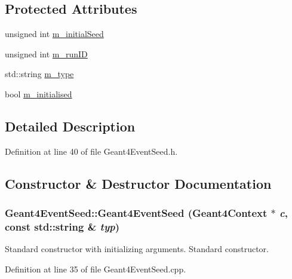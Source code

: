 \subsection*{Protected Attributes}
\begin{DoxyCompactItemize}
\item 
unsigned int \hyperlink{class_d_d4hep_1_1_simulation_1_1_geant4_event_seed_aad2e0264889e33271d97832966d516b0}{m\_\-initialSeed}
\item 
unsigned int \hyperlink{class_d_d4hep_1_1_simulation_1_1_geant4_event_seed_a0810bca4809cd7a1293ed324cb427daa}{m\_\-runID}
\item 
std::string \hyperlink{class_d_d4hep_1_1_simulation_1_1_geant4_event_seed_ae04ac0bb4801305fa677c4f4bce1a1ea}{m\_\-type}
\item 
bool \hyperlink{class_d_d4hep_1_1_simulation_1_1_geant4_event_seed_a8fa0790e30cdbac4a172af5ff0fd7cc7}{m\_\-initialised}
\end{DoxyCompactItemize}


\subsection{Detailed Description}


Definition at line 40 of file Geant4EventSeed.h.

\subsection{Constructor \& Destructor Documentation}
\hypertarget{class_d_d4hep_1_1_simulation_1_1_geant4_event_seed_af30e767cc26c46b017fa8ce36fc8c906}{
\subsubsection[{Geant4EventSeed}]{\setlength{\rightskip}{0pt plus 5cm}Geant4EventSeed::Geant4EventSeed ({\bf Geant4Context} $\ast$ {\em c}, \/  const std::string \& {\em typ})}}
\label{class_d_d4hep_1_1_simulation_1_1_geant4_event_seed_af30e767cc26c46b017fa8ce36fc8c906}


Standard constructor with initializing arguments. Standard constructor. 

Definition at line 35 of file Geant4EventSeed.cpp.

